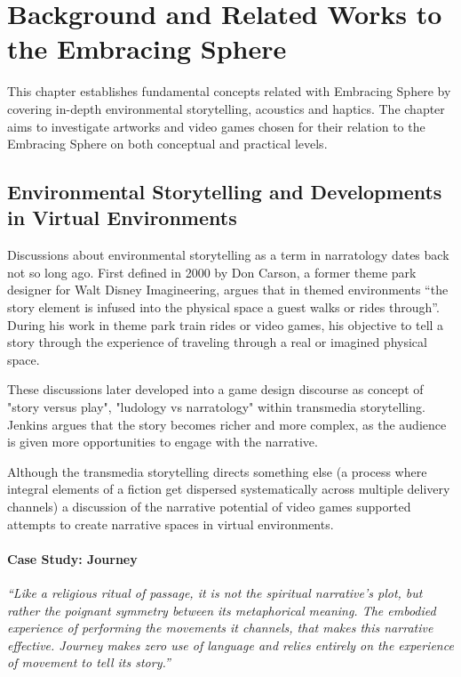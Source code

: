 \chapter{Background and Related Works to the Embracing Sphere}
    This chapter establishes fundamental concepts related with Embracing Sphere by covering in-depth environmental storytelling, acoustics and haptics. The chapter aims to investigate artworks and video games chosen for their relation to the Embracing Sphere on both conceptual and practical levels.\par
    \section{Environmental Storytelling and Developments in Virtual Environments}
        Discussions about environmental storytelling as a term in narratology dates back not so long ago. First defined in 2000 by Don Carson, a former theme park designer for Walt Disney Imagineering, argues that in themed environments “the story element is infused into the physical space a guest walks or rides through”\cite{Liminal_Space_Between_Embedded_and_Emergent_Narrative}. During his work in theme park train rides or video games, his objective to tell a story through the experience of traveling through a real or imagined physical space\cite{Lessons_Learned_from_the_Theme_Park_Industry}.\par

        These discussions later developed into a game design discourse as concept of "story versus play", "ludology vs narratology\cite{Hamlet_on_the_Holodeck}" within transmedia storytelling\cite{Jenkins_Shall_We_Play}. Jenkins argues that the story becomes richer and more complex, as the audience is given more opportunities to engage with the narrative.\par

        Although the transmedia storytelling directs something else (a process where integral elements of a fiction get dispersed systematically across multiple delivery channels\cite{Jenkins_Transmedia}) a discussion of the narrative potential of video games supported attempts to create narrative spaces in virtual environments\cite{Liminal_Space_Between_Embedded_and_Emergent_Narrative}.\par

        \subsubsection{Case Study: Journey}
            \emph{“Like a religious ritual of passage, it is not the spiritual narrative’s plot, but rather the poignant symmetry between its metaphorical meaning. The embodied experience of performing the movements it channels, that makes this narrative effective. Journey makes zero use of language and relies entirely on the experience of movement to tell its story\cite{Game_Movement_as_Enactive_Focalization}\cite{Narrative_Geography}.”}\par

